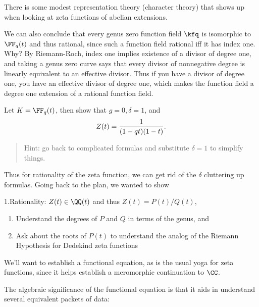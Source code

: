 There is some modest representation theory (character theory) that shows
up when looking at zeta functions of abelian extensions.

\begin{remark}

We can also conclude that every genus zero function field \(\kfq\) is
isomorphic to \(\FF_q(t)\) and thus rational, since such a function
field rational iff it has index one. Why? By Riemann-Roch, index one
implies existence of a divisor of degree one, and taking a genus zero
curve says that every divisor of nonnegative degree is linearly
equivalent to an effective divisor. Thus if you have a divisor of degree
one, you have an effective divisor of degree one, which makes the
function field a degree one extension of a rational function field.

\end{remark}

\begin{exercise}[?]

Let \(K = \FF_q(t)\), then show that \(g=0, \delta = 1\), and
\begin{align*}  
Z(t) = {1 \over (1-qt)(1-t)}
.\end{align*}

\begin{quote}
Hint: go back to complicated formulas and substitute \(\delta=1\) to
simplify things.
\end{quote}

\end{exercise}

Thus for rationality of the zeta function, we can get rid of the
\(\delta\) cluttering up formulas. Going back to the plan, we wanted to
show

1.Rationality: \(Z(t) \in \QQ(t)\) and thus \(Z(t) = P(t) / Q(t)\),

\begin{enumerate}
\def\labelenumi{\arabic{enumi}.}
\setcounter{enumi}{1}
\item
  Understand the degrees of \(P\) and \(Q\) in terms of the genus, and
\item
  Ask about the roots of \(P(t)\) to understand the analog of the
  Riemann Hypothesis for Dedekind zeta functions
\end{enumerate}

We'll want to establish a functional equation, as is the usual yoga for
zeta functions, since it helps establish a meromorphic continuation to
\(\CC\).

The algebraic significance of the functional equation is that it aids in
understand several equivalent packets of data:

